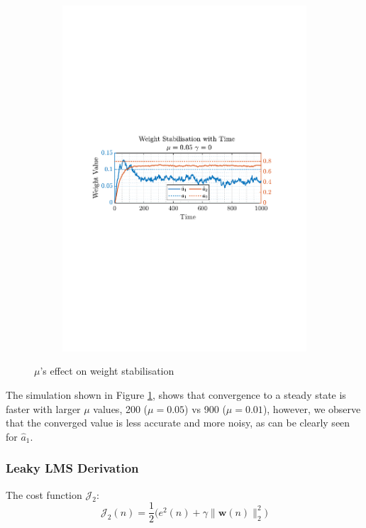 \documentclass[12pt]{article}
\numberwithin{equation}{section}
\def\vw{{\bm{w}}}
\begin{document}
\begin{figure}[H]
\begin{subfigure}{0.49\textwidth}
					\includegraphics[trim={2.2cm 11.2cm 3.00cm  11.2cm}, clip, width
					=\textwidth]{../MATLAB/figures/q2_1cd_fig03.pdf} 
					\captionsetup{justification=centering}
				\end{subfigure}
				\captionsetup{justification=centering}
				\caption{$\mu$'s effect on weight stabilisation}
				\label{fig: 2-1d}
			\end{figure}
		The simulation shown in Figure \ref{fig: 2-1d}, shows that convergence to a steady state is faster with larger $\mu$ values, 200 ($\mu=0.05$) vs 900 ($\mu=0.01$), however, we observe that the converged value is less accurate and more noisy, as can be clearly seen for $\hat{a}_1$.
		\subsubsection{Leaky LMS Derivation}
			The cost function $\mathcal{J}_{2}$:
			\vspace*{-0.6\baselineskip}
			\begin{equation}
			\mathcal{J}_{2}(n) = \frac{1}{2} \bigg( e^{2}(n) + \gamma \| \vw(n) \|_{2}^{2} \bigg)
			\label{eq: 2-1e-J_2}
			\end{equation}
			
\end{document}
